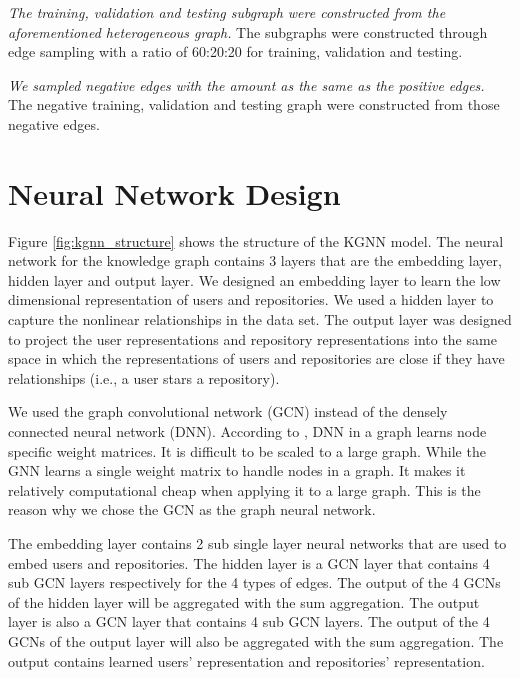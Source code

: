 \documentclass[11pt,twoside]{report}
\begin{document}
\textit{The training, validation and testing subgraph were constructed from the aforementioned heterogeneous graph.} The subgraphs were constructed through edge sampling with a ratio of 60:20:20 for training, validation and testing.

\textit{We sampled negative edges with the amount as the same as the positive edges.} The negative training, validation and testing graph were constructed from those negative edges.

\section{Neural Network Design}
Figure \ref{fig:kgnn_structure} shows the structure of the KGNN model. The neural network for the knowledge graph contains 3 layers that are the embedding layer, hidden layer and output layer. We designed an embedding layer to learn the low dimensional representation of users and repositories. We used a hidden layer to capture the nonlinear relationships in the data set. The output layer was designed to project the user representations and repository representations into the same space in which the representations of users and repositories are close if they have relationships (i.e., a user stars a repository). 

We used the graph convolutional network (GCN) \cite{kipf_semi-supervised_2017} instead of the densely connected neural network (DNN). According to \cite{kipf_semi-supervised_2017}, DNN in a graph learns node specific weight matrices. It is difficult to be scaled to a large graph. While the GNN learns a single weight matrix to handle nodes in a graph. It makes it relatively computational cheap when applying it to a large graph. This is the reason why we chose the GCN as the graph neural network.

The embedding layer contains 2 sub single layer neural networks that are used to embed users and repositories. The hidden layer is a GCN layer that contains 4 sub GCN layers respectively for the 4 types of edges. The output of the 4 GCNs of the hidden layer will be aggregated with the sum aggregation. The output layer is also a GCN layer that contains 4 sub GCN layers. The output of the 4 GCNs of the output layer will also be aggregated with the sum aggregation. The output contains learned users' representation and repositories' representation.
\end{document}
